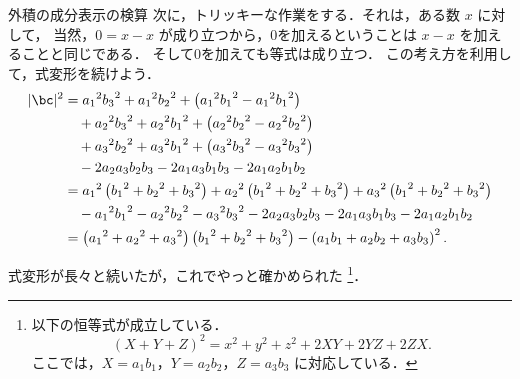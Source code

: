 \begin{mysmallsec}{外積の成分表示の検算}
                次に，トリッキーな作業をする．それは，ある数 $x$ に対して，
                当然，$0=x-x$ が成り立つから，0を加えるということは $x-x$ を加えることと同じである．
                そして0を加えても等式は成り立つ．
                この考え方を利用して，式変形を続けよう．
                    \begin{align*}
                        |\bc|^{2}
                        &= {a_{1}}^{2}{b_{3}}^{2} + {a_{1}}^{2}{b_{2}}^{2}
                            + \left({a_{1}}^{2}{b_{1}}^{2} - {a_{1}}^{2}{b_{1}}^{2}\right) \\
                        &\quad + {a_{2}}^{2}{b_{3}}^{2} + {a_{2}}^{2}{b_{1}}^{2}
                            + \left({a_{2}}^{2}{b_{2}}^{2} - {a_{2}}^{2}{b_{2}}^{2}\right) \\
                        &\quad + {a_{3}}^{2}{b_{2}}^{2} + {a_{3}}^{2}{b_{1}}^{2}
                            + \left({a_{3}}^{2}{b_{3}}^{2} - {a_{3}}^{2}{b_{3}}^{2}\right) \\
                        &\quad - 2a_{2}a_{3}b_{2}b_{3} - 2a_{1}a_{3}b_{1}b_{3} - 2a_{1}a_{2}b_{1}b_{2} \\
                        &=   {a_{1}}^{2}\left({b_{1}}^{2} + {b_{2}}^{2} + {b_{3}}^{2}\right)
                           + {a_{2}}^{2}\left({b_{1}}^{2} + {b_{2}}^{2} + {b_{3}}^{2}\right)
                           + {a_{3}}^{2}\left({b_{1}}^{2} + {b_{2}}^{2} + {b_{3}}^{2}\right) \\
                        &\quad -{a_{1}}^{2}{b_{1}}^{2} - {a_{2}}^{2}{b_{2}}^{2} - {a_{3}}^{2}{b_{3}}^{2}
                               - 2a_{2}a_{3}b_{2}b_{3} - 2a_{1}a_{3}b_{1}b_{3} - 2a_{1}a_{2}b_{1}b_{2} \\
                        &=  \left( {a_{1}}^{2} + {a_{2}}^{2} + {a_{3}}^{2} \right)
                            \left( {b_{1}}^{2} + {b_{2}}^{2} + {b_{3}}^{2} \right)
                           -\left(a_{1}b_{1}+a_{2}b_{2}+a_{3}b_{3}\right)^{2}.
                    \end{align*}

                式変形が長々と続いたが，これでやっと確かめられた
                \footnote{
                    以下の恒等式が成立している．
                        \begin{equation*}
                            \left( X + Y + Z \right)^{2}
                            = {x}^{2} + {y}^{2} + {z}^{2} + 2XY + 2YZ + 2ZX.
                        \end{equation*}
                    ここでは，$X=a_{1}b_{1}$，$Y=a_{2}b_{2}$，$Z=a_{3}b_{3}$ に対応している．
                }．


\end{mysmallsec}
